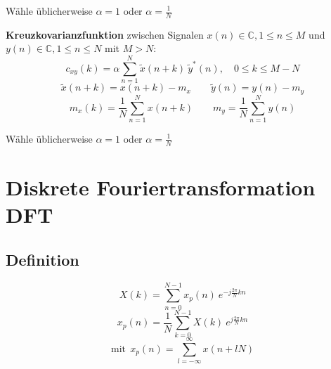 \documentclass[10pt,a4paper]{article}
\begin{document}
\begin{multicols}{2}
\begin{adjustbox}{valign=t,center=0.48\textwidth,margin=1ex,minipage=[t][][t]{0.43\textwidth},bgcolor=white,cfbox=black 1.5pt 0pt 1pt}
		Wähle üblicherweise $\alpha = 1$ oder $\alpha = \frac{1}{N}$
	\end{adjustbox}

	\begin{adjustbox}{valign=t,center=0.48\textwidth,margin=1ex,minipage=[t][][t]{0.43\textwidth},bgcolor=white,cfbox=black 1.5pt 0pt 1pt}
		\textbf{Kreuzkovarianzfunktion} zwischen Signalen $x(n) \in \mathbb C, 1 \leq n \leq M$ und $y(n) \in \mathbb C, 1 \leq n \leq N$ mit $M > N$:
		\footnotesize
		\[ c_{xy}(k) = \alpha \sum_{n = 1}^N \tilde x(n + k) ~ \tilde y^*(n), \quad 0 \leq k \leq M - N \]
		\[ \tilde x(n + k) = x(n + k) - m_x \qquad \tilde y(n) = y(n) - m_y \]
		\[ m_x(k) = \frac{1}{N} \sum_{n = 1}^N x(n+k) \qquad m_y = \frac{1}{N} \sum_{n = 1}^N y(n) \]

		Wähle üblicherweise $\alpha = 1$ oder $\alpha = \frac{1}{N}$
	\end{adjustbox}
\end{multicols}


\newpage
\section*{Diskrete Fouriertransformation DFT}
\subsection*{Definition}
\vspace{-1.5em}
\begin{multicols}{3}
	\noindent
	\[ X(k) = \sum_{n = 0}^{N - 1} x_p(n) ~ e^{-j\frac{2\pi}{N}kn} \]
	\[ x_p(n) = \frac{1}{N} \sum_{k = 0}^{N - 1} X(k) ~ e^{j\frac{2\pi}{N}kn} \]
	\[ \text{mit} ~~ x_p(n) = \sum_{l = -\infty}^{\infty} x(n + lN) \]
\end{multicols}
\end{document}
